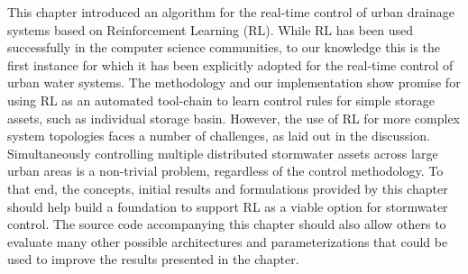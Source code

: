 This chapter introduced an algorithm for the real-time control of urban drain\-age systems based on Reinforcement Learning (RL).
While RL has been used successfully in the computer science communities, to our knowledge this is the first instance for which it has been explicitly adopted for the real-time control of urban water systems.
The methodology and our implementation show promise for using RL as an automated tool-chain to learn control rules for simple storage assets, such as individual storage basin.
However, the use of RL for more complex system topologies faces a number of challenges, as laid out in the discussion.
Simultaneously controlling multiple distributed stormwater assets across large urban areas is a non-trivial problem, regardless of the control methodology.
To that end, the concepts, initial results and formulations provided by this chapter should help build a foundation to support RL as a viable option for stormwater control.
The source code accompanying this chapter should also allow others to evaluate many other possible architectures and parameterizations that could be used to improve the results presented in the chapter.
